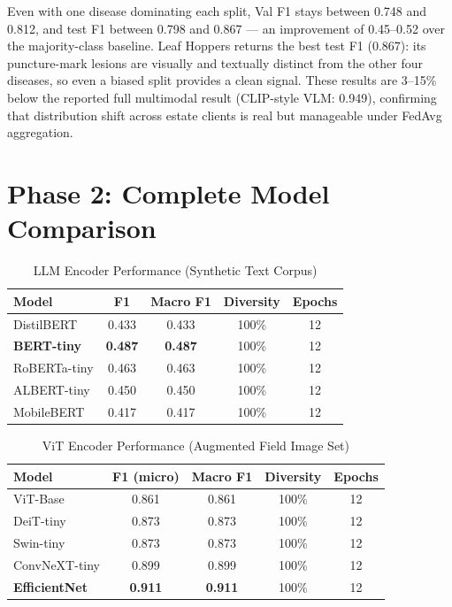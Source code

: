 \documentclass[12pt, a4paper, oneside]{Thesis}
\begin{document}
Even with one disease dominating each split, Val F1 stays between 0.748 and 0.812,
and test F1 between 0.798 and 0.867 --- an improvement of 0.45--0.52 over the
majority-class baseline. Leaf Hoppers returns the best test F1 (0.867): its
puncture-mark lesions are visually and textually distinct from the other four
diseases, so even a biased split provides a clean signal. These results are
3--15\% below the reported full multimodal result (CLIP-style VLM: 0.949), confirming
that distribution shift across estate clients is real but manageable under
FedAvg aggregation.

\section{Phase 2: Complete Model Comparison}


\begin{table}[t]
\caption{LLM Encoder Performance (Synthetic Text Corpus)}
\label{tab:llmres}
\centering\footnotesize
\begin{tabular}{lcccc}
\toprule
\textbf{Model} & \textbf{F1} & \textbf{Macro F1} & \textbf{Diversity} & \textbf{Epochs}\\
\midrule
DistilBERT    & 0.433 & 0.433 & 100\% & 12 \\
\textbf{BERT-tiny} & \textbf{0.487} & \textbf{0.487} & 100\% & 12 \\
RoBERTa-tiny  & 0.463 & 0.463 & 100\% & 12 \\
ALBERT-tiny   & 0.450 & 0.450 & 100\% & 12 \\
MobileBERT    & 0.417 & 0.417 & 100\% & 12 \\
\bottomrule
\end{tabular}
\end{table}

\begin{table}[t]
\caption{ViT Encoder Performance (Augmented Field Image Set)}
\label{tab:vitres}
\centering\footnotesize
\begin{tabular}{lcccc}
\toprule
\textbf{Model} & \textbf{F1 (micro)} & \textbf{Macro F1} & \textbf{Diversity} & \textbf{Epochs}\\
\midrule
ViT-Base      & 0.861 & 0.861 & 100\% & 12 \\
DeiT-tiny     & 0.873 & 0.873 & 100\% & 12 \\
Swin-tiny     & 0.873 & 0.873 & 100\% & 12 \\
ConvNeXT-tiny & 0.899 & 0.899 & 100\% & 12 \\
\textbf{EfficientNet} & \textbf{0.911} & \textbf{0.911} & 100\% & 12 \\
\bottomrule
\end{tabular}
\end{table}
\end{document}
